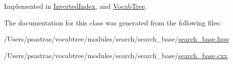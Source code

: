 Implemented in \hyperlink{classInvertedIndex_ae3f81ab03c477a2813c95334473c8e95}{Inverted\-Index}, and \hyperlink{classVocabTree_a28fae9e130e85b6e7daa3e6f7d44105c}{Vocab\-Tree}.



The documentation for this class was generated from the following files\-:\begin{DoxyCompactItemize}
\item 
/\-Users/psastras/vocabtree/modules/search/search\-\_\-base/\hyperlink{search__base_8hpp}{search\-\_\-base.\-hpp}\item 
/\-Users/psastras/vocabtree/modules/search/search\-\_\-base/\hyperlink{search__base_8cxx}{search\-\_\-base.\-cxx}\end{DoxyCompactItemize}
